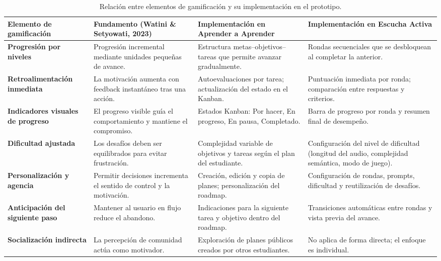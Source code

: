 \begin{table}[H]
\centering
\footnotesize
\setlength{\tabcolsep}{6pt}
\renewcommand{\arraystretch}{1.4}
\begin{tabular}{|p{3.2cm}|p{3.2cm}|p{4.2cm}|p{4.2cm}|}
\hline
\textbf{Elemento de gamificación} & \textbf{Fundamento (Watini \& Setyowati, 2023)} & \textbf{Implementación en Aprender a Aprender} & \textbf{Implementación en Escucha Activa} \\
\hline

\textbf{Progresión por niveles} &
Progresión incremental mediante unidades pequeñas de avance. &
Estructura metas–objetivos–tareas que permite avanzar gradualmente. &
Rondas secuenciales que se desbloquean al completar la anterior. \\
\hline

\textbf{Retroalimentación inmediata} &
La motivación aumenta con feedback instantáneo tras una acción. &
Autoevaluaciones por tarea; actualización del estado en el Kanban. &
Puntuación inmediata por ronda; comparación entre respuestas y criterios. \\
\hline

\textbf{Indicadores visuales de progreso} &
El progreso visible guía el comportamiento y mantiene el compromiso. &
Estados Kanban: Por hacer, En progreso, En pausa, Completado. &
Barra de progreso por ronda y resumen final de desempeño. \\
\hline

\textbf{Dificultad ajustada} &
Los desafíos deben ser equilibrados para evitar frustración. &
Complejidad variable de objetivos y tareas según el plan del estudiante. &
Configuración del nivel de dificultad (longitud del audio, complejidad semántica, modo de juego). \\
\hline

\textbf{Personalización y agencia} &
Permitir decisiones incrementa el sentido de control y la motivación. &
Creación, edición y copia de planes; personalización del roadmap. &
Configuración de rondas, prompts, dificultad y reutilización de desafíos. \\
\hline

\textbf{Anticipación del siguiente paso} &
Mantener al usuario en flujo reduce el abandono. &
Indicaciones para la siguiente tarea y objetivo dentro del roadmap. &
Transiciones automáticas entre rondas y vista previa del avance. \\
\hline

\textbf{Socialización indirecta} &
La percepción de comunidad actúa como motivador. &
Exploración de planes públicos creados por otros estudiantes. &
No aplica de forma directa; el enfoque es individual. \\
\hline

\end{tabular}
\caption{Relación entre elementos de gamificación y su implementación en el prototipo.}
\label{table:gamification-elements}
\end{table}